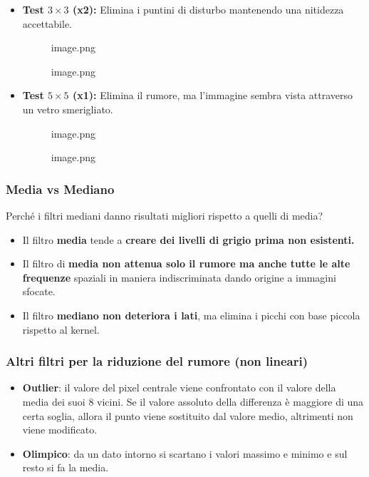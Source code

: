 \documentclass[
]{article}
\providecommand{\tightlist}{%
  \setlength{\itemsep}{0pt}\setlength{\parskip}{0pt}}
\begin{document}
\begin{itemize}
\item
  \textbf{Test \(3 \times 3\) (x2):} Elimina i puntini di disturbo mantenendo una nitidezza accettabile.

  \begin{figure}
  \centering
  {image.png}
  \caption{image.png}
  \end{figure}
\item
  \textbf{Test \(5 \times 5\) (x1):} Elimina il rumore, ma l'immagine sembra vista attraverso un vetro smerigliato.

  \begin{figure}
  \centering
  {image.png}
  \caption{image.png}
  \end{figure}
\end{itemize}

\hypertarget{media-vs-mediano}{%
\subsubsection{Media vs Mediano}\label{media-vs-mediano}}

Perché i filtri mediani danno risultati migliori rispetto a quelli di media?

\begin{itemize}
\tightlist
\item
  Il filtro \textbf{media} tende a \textbf{creare dei livelli di grigio prima non esistenti.}
\item
  Il filtro di \textbf{media non attenua solo il rumore ma anche tutte le alte frequenze} spaziali in maniera indiscriminata dando origine a immagini sfocate.
\item
  Il filtro \textbf{mediano non deteriora i lati}, ma elimina i picchi con base piccola rispetto al kernel.
\end{itemize}

\hypertarget{altri-filtri-per-la-riduzione-del-rumore-non-lineari}{%
\subsubsection{Altri filtri per la riduzione del rumore (non lineari)}\label{altri-filtri-per-la-riduzione-del-rumore-non-lineari}}

\begin{itemize}
\tightlist
\item
  \textbf{Outlier}: il valore del pixel centrale viene confrontato con il valore della media dei suoi 8 vicini. Se il valore assoluto della differenza è maggiore di una certa soglia, allora il punto viene sostituito dal valore medio, altrimenti non viene modificato.
\item
  \textbf{Olimpico}: da un dato intorno si scartano i valori massimo e minimo e sul resto si fa la media.
\end{itemize}
\end{document}
